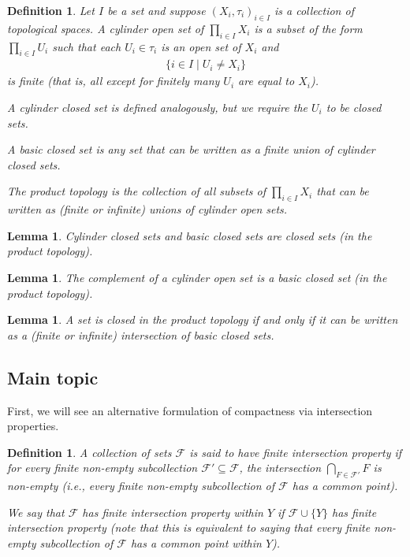 \documentclass[12pt]{article}
\theoremstyle{bigskipthmstyle}
\theoremstyle{thmstyle}
\newtheorem{lemma}[theorem]{Lemma}
\theoremstyle{plainstyle}
\newtheorem{definition}[theorem]{Definition}
\newcommand{\cF}{\mathcal{F}}
\begin{document}
\begin{definition}
  Let $I$ be a set and suppose $(X_i,\tau_i)_{i\in I}$ is a collection of topological spaces. A
  \emph{cylinder open set} of $\prod_{i\in I} X_i$ is a subset of the form $\prod_{i\in I} U_i$ such
  that each $U_i\in\tau_i$ is an open set of $X_i$ and
  \begin{align*}
    \{i\in I \mid U_i\neq X_i\}
  \end{align*}
  is finite (that is, all except for finitely many $U_i$ are equal to $X_i$).

  A \emph{cylinder closed set} is defined analogously, but we require the $U_i$ to be closed sets.

  A \emph{basic closed set} is any set that can be written as a finite union of cylinder closed sets.

  The \emph{product topology} is the collection of all subsets of $\prod_{i\in I} X_i$ that can be
  written as (finite or infinite) unions of cylinder open sets.
\end{definition}

\begin{lemma}
  Cylinder closed sets and basic closed sets are closed sets (in the product topology).
\end{lemma}

\begin{lemma}\label{lem:compopen}
  The complement of a cylinder open set is a basic closed set (in the product topology).
\end{lemma}

\begin{lemma}\label{lem:closed}
  A set is closed in the product topology if and only if it can be written as a (finite or infinite)
  intersection of basic closed sets.
\end{lemma}

\subsection{Main topic}

First, we will see an alternative formulation of compactness via intersection properties.

\begin{definition}
  A collection of sets $\cF$ is said to have \emph{finite intersection property} if for every
  \emph{finite} non-empty subcollection $\cF'\subseteq\cF$, the intersection $\bigcap_{F\in\cF'} F$
  is non-empty (i.e., every finite non-empty subcollection of $\cF$ has a common point).

  We say that $\cF$ has \emph{finite intersection property within $Y$} if $\cF\cup\{Y\}$ has finite
  intersection property (note that this is equivalent to saying that every finite non-empty
  subcollection of $\cF$ has a common point within $Y$).
\end{definition}
\end{document}
